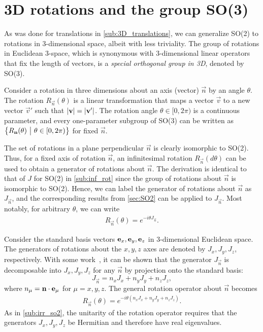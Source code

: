 \section{3D rotations and the group SO(3)}\label{sec:SO3}
As was done for translations in \cref{sub:3D_translations}, we can generalize SO(2) to rotations in 3-dimensional space, albeit with less triviality. The group of rotations in Euclidean 3-space, which is synonymous with 3-dimensional linear operators that fix the length of vectors, is a \textit{special orthogonal group in 3D}, denoted by SO(3).

Consider a rotation in three dimensions about an axis (vector) $\vec{n}$ by an angle $\theta$. The rotation $R_{\vec{n}}(\theta)$ is a linear transformation that maps a vector $\vec{v}$ to a new vector $\vec{v}'$ such that $\left|\mathbf{v}\right|=\left|\mathbf{v}'\right|$. The rotation angle $\theta\in[0,2\pi)$ is a continuous parameter, and every one-parameter subgroup of SO(3) can be written as $\left\{ R_{\mathbf{n}}(\theta) ~\big|~ \theta\in[0,2\pi) \right\}$ for fixed $\vec{n}$.

The set of rotations in a plane perpendicular $\vec{n}$ is clearly isomorphic to SO(2). Thus, for a fixed axis of rotation $\vec{n}$, an infinitesimal rotation $R_{\vec{n}}(d\theta)$ can be used to obtain a generator of rotations about $\vec{n}$. The derivation is identical to that of $J$ for SO(2) in \cref{sub:inf_rot} since the group of rotations about $\vec{n}$ is isomorphic to SO(2). Hence, we can label the generator of rotations about $\vec{n}$ as $J_{\vec{n}}$, and the corresponding results from \cref{sec:SO2} can be applied to $J_{\vec{n}}$. Most notably, for arbitrary $\theta$, we can write
\begin{align*}
    R_{\vec{n}}(\theta) = e^{-i\theta J_{\vec{n}}}.
\end{align*}

Consider the standard basis vectors $\mathbf{e}_x,\mathbf{e}_y,\mathbf{e}_z$ in 3-dimensional Euclidean space. The generators of rotations about the $x,y,z$ axes are denoted by $J_x,J_y,J_z$, respectively. With some work~\cite{Tung1985}, it can be shown that the generator $J_{\vec{n}}$ is decomposable into $J_x,J_y,J_z$ for any $\vec{n}$ by projection onto the standard basis:
\begin{equation}
    J_{\vec{n}} = n_x J_x + n_y J_y + n_z J_z,
\end{equation}
where $n_\mu = \mathbf{n}\cdot\mathbf{e}_\mu$ for $\mu=x,y,z$.
The general rotation operator about $\vec{n}$ becomes
\begin{align*}
    R_{\vec{n}}(\theta) = e^{-i\theta(n_x J_x + n_y J_y + n_z J_z)}.
\end{align*}
As in \cref{sub:irr_so2}, the unitarity of the rotation operator requires that the generators $J_x,J_y,J_z$ be Hermitian and therefore have real eigenvalues.

